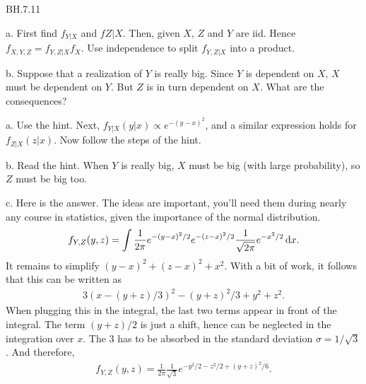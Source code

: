 \begin{exercise}
BH.7.11
\begin{hint}
a.
First find $f_{Y|X}$ and $f{Z|X}$. Then, given $X$, $Z$ and $Y$ are iid. Hence $f_{X,Y,Z} = f_{Y, Z |X} f_{X}$. Use independence to split $f_{Y,Z|X}$ into a product.


b.
Suppose that  a realization of $Y$ is really big. Since $Y$ is dependent on $X$, $X$ must be dependent on $Y$. But $Z$ is in turn dependent on $X$. What are the consequences?

\end{hint}
\begin{solution}
a. Use the hint. Next, $f_{Y|X}(y|x) \propto e^{-(y-x)^{2}}$, and a similar expression holds for $f_{Z|X}(z|x)$. Now follow the steps of the hint.

b. Read the hint. When $Y$ is really big, $X$ must be big (with large probability), so $Z$ must be big too.

 c.
Here is the answer. The ideas are important, you'll need them during nearly any course in statistics, given the importance of the normal distribution.
\begin{align*}
f_{Y,Z}(y, z) = \int \frac 1 {2\pi} e^{-(y-x)^2/2} e^{-(z-x)^2/2} \frac 1 {\sqrt{2\pi}} e^{-x^2/2}\,\textrm{d}x.
\end{align*}
It remains to simplify $(y-x)^2 + (z-x)^2 + x^2$. With a bit of work, it follows that this can be written as
\begin{align*}
3(x-(y+z)/3)^{2} - (y+z)^2/3+y^2+z^2.
\end{align*}
When plugging this in the integral, the last two terms appear in front of the integral. The term $(y+z)/2$ is just a shift, hence can be neglected in the integration over $x$. The $3$ has to be absorbed in the standard deviation $\sigma=1/\sqrt{3}$. And therefore,
\begin{align*}
f_{Y,Z}(y, z) = \frac 1 {2\pi} \frac 1 {\sqrt{3}} e^{-y^2/2 - z^2/2 + (y+z)^2/6}.
\end{align*}
\end{solution}
\end{exercise}

